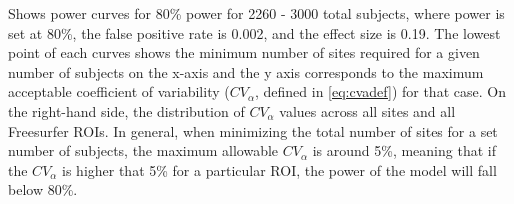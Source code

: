 \label{fig:cv_j} Shows power curves for 80\% power for 2260 - 3000 total subjects, where power is set at 80\%, the false positive rate is 0.002, and the effect size is 0.19. The lowest point of each curves shows the minimum number of sites required for a given number of subjects on the x-axis and the y axis corresponds to the maximum acceptable coefficient of variability ($CV_{\alpha}$, defined in \ref{eq:cvadef}) for that case. On the right-hand side, the distribution of $CV_{\alpha}$ values across all sites and all Freesurfer ROIs. In general, when minimizing the total number of sites for a set number of subjects, the maximum allowable $CV_{\alpha}$ is around 5\%, meaning that if the $CV_{\alpha}$ is higher that 5\% for a particular ROI, the power of the model will fall below 80\%.